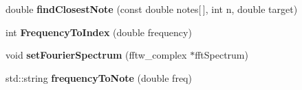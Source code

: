 \begin{DoxyCompactItemize}
\item 
\hypertarget{classVocoder_a0bc26c9977b46623e3c3fc3bc733ed24}{double {\bfseries find\-Closest\-Note} (const double notes\mbox{[}$\,$\mbox{]}, int n, double target)}\label{classVocoder_a0bc26c9977b46623e3c3fc3bc733ed24}

\item 
\hypertarget{classVocoder_aae99cff1d3e7fc029433998dc7fd0381}{int {\bfseries Frequency\-To\-Index} (double frequency)}\label{classVocoder_aae99cff1d3e7fc029433998dc7fd0381}

\item 
\hypertarget{classVocoder_a223d77b73ef3b2fa8be406e46f671441}{void {\bfseries set\-Fourier\-Spectrum} (fftw\-\_\-complex $\ast$fft\-Spectrum)}\label{classVocoder_a223d77b73ef3b2fa8be406e46f671441}

\item 
\hypertarget{classVocoder_a29b2cb9e8790424dbeefa927fdfbfe71}{std\-::string {\bfseries frequency\-To\-Note} (double freq)}\label{classVocoder_a29b2cb9e8790424dbeefa927fdfbfe71}

\end{DoxyCompactItemize}
